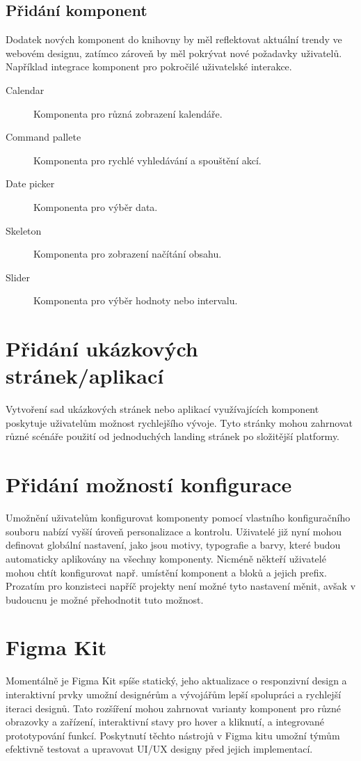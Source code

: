 \subsection{Přidání komponent}
Dodatek nových komponent do knihovny by měl reflektovat aktuální trendy ve webovém designu, zatímco zároveň by měl pokrývat nové požadavky uživatelů. Například integrace komponent pro pokročilé uživatelské interakce.

\begin{description}
  \item[Calendar] Komponenta pro různá zobrazení kalendáře.
  \item[Command pallete] Komponenta pro rychlé vyhledávání a spouštění akcí.
  \item[Date picker] Komponenta pro výběr data.
  \item[Skeleton] Komponenta pro zobrazení načítání obsahu.
  \item[Slider] Komponenta pro výběr hodnoty nebo intervalu.
\end{description}

\section{Přidání ukázkových stránek/aplikací}
Vytvoření sad ukázkových stránek nebo aplikací využívajících komponent poskytuje uživatelům možnost rychlejšího vývoje. Tyto stránky mohou zahrnovat různé scénáře použití od jednoduchých landing stránek po složitější platformy.

\section{Přidání možností konfigurace}
Umožnění uživatelům konfigurovat komponenty pomocí vlastního konfiguračního souboru nabízí vyšší úroveň personalizace a kontrolu. Uživatelé již nyní mohou definovat globální nastavení, jako jsou motivy, typografie a barvy, které budou automaticky aplikovány na všechny komponenty. Nicméně někteří uživatelé mohou chtít konfigurovat např. umístění komponent a bloků a jejich prefix. Prozatím pro konzisteci napříč projekty není možné tyto nastavení měnit, avšak v budoucnu je možné přehodnotit tuto možnost.

\section{Figma Kit}
Momentálně je Figma Kit spíše statický, jeho aktualizace o responzivní design a interaktivní prvky umožní designérům a vývojářům lepší spolupráci a rychlejší iteraci designů. Tato rozšíření mohou zahrnovat varianty komponent pro různé obrazovky a zařízení, interaktivní stavy pro hover a kliknutí, a integrované prototypování funkcí. Poskytnutí těchto nástrojů v Figma kitu umožní týmům efektivně testovat a upravovat UI/UX designy před jejich implementací.

